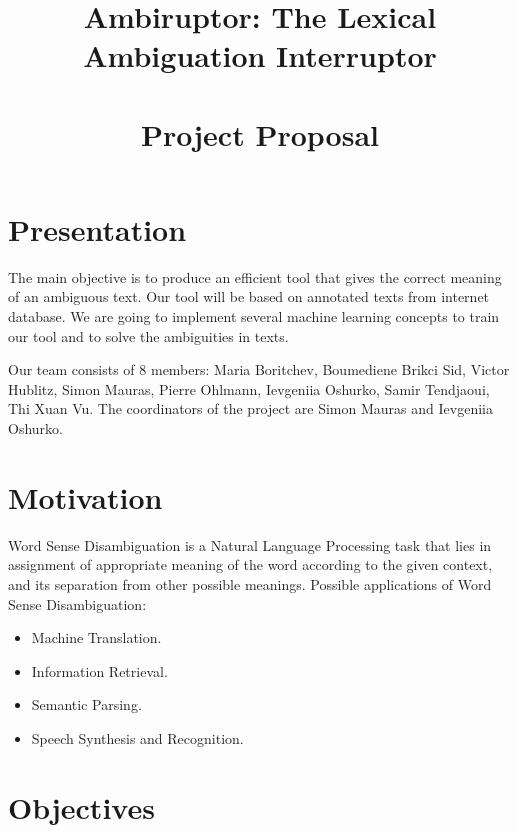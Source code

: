\documentclass[11pt,a4paper]{article}
\title{\textbf{Ambiruptor: The Lexical Ambiguation
    Interruptor}\\~\\Project Proposal}
\begin{document}
\maketitle

\vspace{1cm}
\section*{Presentation}

The main objective is to produce an efficient tool that gives the correct meaning of an ambiguous text. Our tool will be based on annotated texts from internet database. We are going to implement several machine learning concepts to train our tool and to solve the ambiguities in texts.

Our team consists of 8 members: Maria Boritchev, Boumediene Brikci Sid,
Victor Hublitz, Simon Mauras, Pierre Ohlmann, Ievgeniia Oshurko, Samir
Tendjaoui, Thi Xuan Vu. The coordinators of the project are Simon Mauras and Ievgeniia Oshurko.
\vspace{1cm}
\tableofcontents

\newpage


\section*{Motivation}

Word Sense Disambiguation is a Natural Language Processing task that lies in assignment of appropriate meaning of the word according to the given context, and its separation from other possible meanings.
Possible applications of Word Sense Disambiguation:
\begin{itemize}
	\item Machine Translation.
	\item Information Retrieval.
	\item Semantic Parsing.
	\item Speech Synthesis and Recognition.
\end{itemize}

\section{Objectives}
\end{document}
